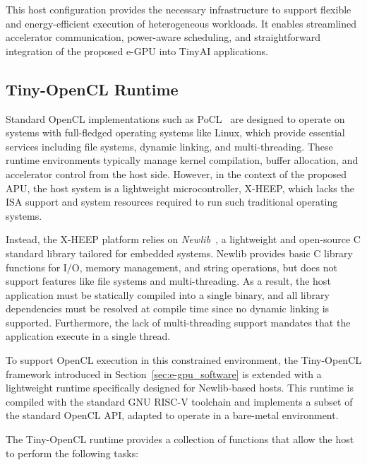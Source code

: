             This host configuration provides the necessary infrastructure to support flexible and energy-efficient execution of heterogeneous workloads. It enables streamlined accelerator communication, power-aware scheduling, and straightforward integration of the proposed \mbox{e-GPU} into TinyAI applications.

        \subsection{Tiny-OpenCL Runtime}
        
            Standard OpenCL implementations such as \mbox{PoCL}~\cite{pocl} are designed to operate on systems with full-fledged operating systems like Linux, which provide essential services including file systems, dynamic linking, and multi-threading. These runtime environments typically manage kernel compilation, buffer allocation, and accelerator control from the host side. However, in the context of the proposed APU, the host system is a lightweight microcontroller, \mbox{X-HEEP}, which lacks the ISA support and system resources required to run such traditional operating systems.
        
            Instead, the \mbox{X-HEEP} platform relies on \emph{Newlib}~\cite{newlib}, a lightweight and open-source C standard library tailored for embedded systems. \mbox{Newlib} provides basic C library functions for I/O, memory management, and string operations, but does not support features like file systems and multi-threading. As a result, the host application must be statically compiled into a single binary, and all library dependencies must be resolved at compile time since no dynamic linking is supported. Furthermore, the lack of multi-threading support mandates that the application execute in a single thread.
        
            To support OpenCL execution in this constrained environment, the \mbox{Tiny-OpenCL} framework introduced in Section~\ref{sec:e-gpu_software} is extended with a lightweight runtime specifically designed for \mbox{Newlib}-based hosts. This runtime is compiled with the standard GNU RISC-V toolchain and implements a subset of the standard OpenCL API, adapted to operate in a bare-metal environment.
        
            The \mbox{Tiny-OpenCL} runtime provides a collection of functions that allow the host to perform the following tasks:
            
